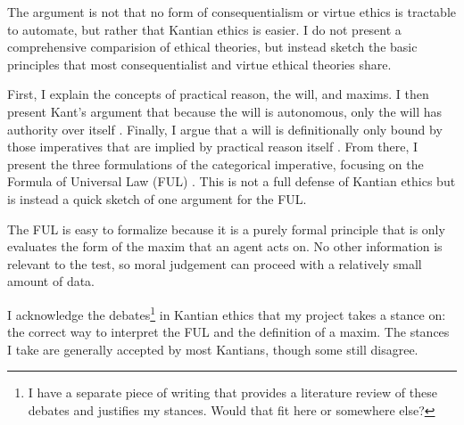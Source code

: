 \begin{isabellebody}
\begin{isamarkuptext}
The argument is not that no form of consequentialism or virtue ethics is tractable to automate, but 
rather that Kantian ethics is easier. I do not present a comprehensive comparision
of ethical theories, but instead sketch the basic principles that most consequentialist and virtue 
ethical theories share.%
\end{isamarkuptext}\isamarkuptrue%
%
\isadelimdocument
%
\endisadelimdocument
%
\isatagdocument
%
\isamarkuptrue%
%
\isamarkuptrue%
%
\endisatagdocument
{\isafolddocument}%
%
\isadelimdocument
%
\endisadelimdocument
%
\begin{isamarkuptext}%
First, I explain the concepts of 
practical reason, the will, and maxims. I then present Kant's argument that because the will is autonomous,
only the will has authority over itself \cite{sources}. Finally, I argue that a will is definitionally only 
bound by those imperatives that are implied by practical reason itself \cite{velleman}. From there, I present 
the three formulations of the categorical imperative, focusing on the Formula of Universal Law (FUL) \cite{groundwork}. 
This is not a full defense of Kantian ethics but is instead a quick sketch of one argument for the FUL.%
\end{isamarkuptext}\isamarkuptrue%
%
\isadelimdocument
%
\endisadelimdocument
%
\isatagdocument
%
\isamarkuptrue%
%
\endisatagdocument
{\isafolddocument}%
%
\isadelimdocument
%
\endisadelimdocument
%
\begin{isamarkuptext}%
The FUL is easy to formalize because it is a purely formal principle that is only evaluates the 
form of the maxim that an agent 
acts on. No other information is relevant to the test, so moral judgement can proceed with a relatively small
amount of data.%
\end{isamarkuptext}\isamarkuptrue%
%
\isadelimdocument
%
\endisadelimdocument
%
\isatagdocument
%
\isamarkuptrue%
%
\endisatagdocument
{\isafolddocument}%
%
\isadelimdocument
%
\endisadelimdocument
%
\begin{isamarkuptext}%
I acknowledge the debates\footnote{I have a separate piece of writing that provides a literature 
review of these debates and justifies my stances. Would that fit here or somewhere else?} in Kantian 
ethics that my project takes a stance on: the correct way to interpret the FUL and the definition of a 
maxim. The stances I take are generally accepted by most Kantians, though some still disagree.%

\end{isamarkuptext}
\end{isabellebody}
